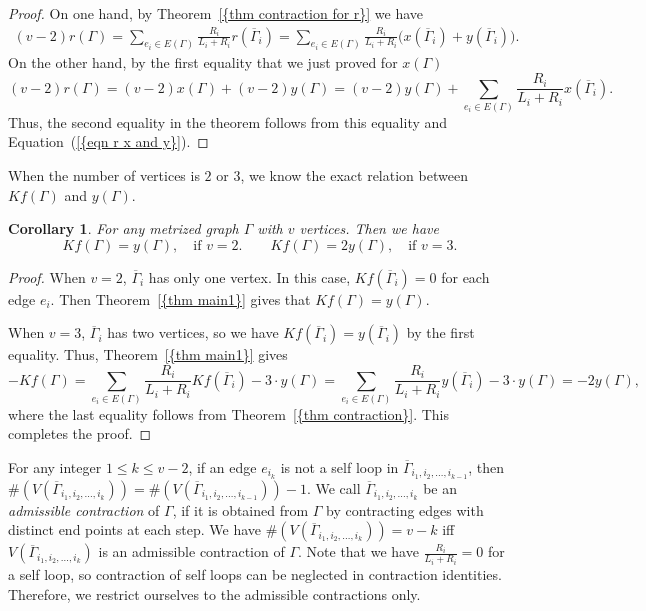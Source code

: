 \documentclass[12pt]{amsart}
\newtheorem{corollary}[theorem]{Corollary}
\theoremstyle{example}
\theoremstyle{definition}
\theoremstyle{notation}
\begin{document}
\begin{proof}
On one hand, by {Theorem~\ref{{thm contraction for r}}} we have
\begin{equation}\label{eqn r x and y}
\begin{split}
(v-2)r({\Gamma})=\sum_{e_i \in {E({\Gamma})}} \frac{R_{i}}{ {L_{i}} + {R_{i}} } r({{\overline{\Gamma}}}_i)=\sum_{e_i \in {E({\Gamma})}} \frac{R_{i}}{ {L_{i}} + {R_{i}} } \big( x({{\overline{\Gamma}}}_i)+ y({{\overline{\Gamma}}}_i) \big).
\end{split}
\end{equation}
On the other hand, by the first equality that we just proved for $x({\Gamma})$
$$(v-2)r({\Gamma})=(v-2)x({\Gamma})+(v-2)y({\Gamma})=(v-2)y({\Gamma})+\sum_{e_i \in {E({\Gamma})}} \frac{R_{i}}{ {L_{i}} + {R_{i}} }x({{\overline{\Gamma}}}_i).$$
Thus, the second equality in the theorem follows from this equality and {Equation~(\ref{{eqn r x and y}})}.
\end{proof}
When the number of vertices is $2$ or $3$, we know the exact relation between $Kf({\Gamma})$ and $y({\Gamma})$.
\begin{corollary}\label{cor Kirchhoff v=2 or 3}
For any metrized graph ${\Gamma}$ with $v$ vertices. Then we have
$$ Kf({\Gamma})=y({\Gamma}), \quad \text{if $v=2$}. \qquad Kf({\Gamma})=2y({\Gamma}), \quad \text{if $v=3$}.$$
\end{corollary}
\begin{proof}
When $v=2$, ${{\overline{\Gamma}}}_i$ has only one vertex. In this case, $Kf({{\overline{\Gamma}}}_i)=0$ for each edge $e_i$. Then {Theorem~\ref{{thm main1}}} gives
that $Kf({\Gamma})=y({\Gamma})$.

When $v=3$, ${{\overline{\Gamma}}}_i$ has two vertices, so we have  $Kf({{\overline{\Gamma}}}_i)=y({{\overline{\Gamma}}}_i)$ by the first equality. Thus, {Theorem~\ref{{thm main1}}} gives
$$-Kf({\Gamma})=\sum_{e_i \in {E({\Gamma})}} \frac{R_{i}}{{L_{i}}+{R_{i}}} Kf({{\overline{\Gamma}}}_i) - 3 \cdot y({\Gamma})=
\sum_{e_i \in {E({\Gamma})}} \frac{R_{i}}{{L_{i}}+{R_{i}}} y({{\overline{\Gamma}}}_i) - 3 \cdot y({\Gamma})
= -2y({\Gamma}), $$
where the last equality follows from {Theorem~\ref{{thm contraction}}}.
This completes the proof.
\end{proof}

For any integer $1 \leq k \leq v-2$, if an edge $e_{i_k}$ is not a self loop in ${{\overline{\Gamma}}}_{i_1,i_2, \dots, i_{k-1}}$, then $\#({V({{{\overline{\Gamma}}}_{i_1,i_2, \dots, i_k}})})= \#({V({{{\overline{\Gamma}}}_{i_1,i_2, \dots, i_{k-1}}})})-1$. We call ${{\overline{\Gamma}}}_{i_1,i_2, \dots, i_{k}}$ be an \textit{admissible contraction} of ${\Gamma}$, if it is obtained from ${\Gamma}$ by contracting edges with distinct end points at each step.
We have $\#({V({{{\overline{\Gamma}}}_{i_1,i_2, \dots, i_{k}}})})=v-k$ iff ${V({{{\overline{\Gamma}}}_{i_1,i_2, \dots, i_{k}}})}$ is an admissible contraction of ${\Gamma}$. Note that we have $\frac{R_{i}}{{L_{i}}+{R_{i}}}=0$ for a self loop, so contraction of self loops can be neglected in contraction identities. Therefore, we restrict ourselves to the admissible contractions only.
\end{document}
